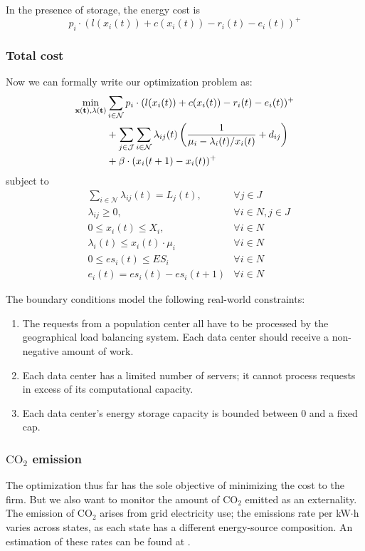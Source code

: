 \documentclass{acm_proc_article-sp}
\newcommand{\carbondioxide}{\ensuremath{\mathrm{CO}_2}}
\begin{document}
In the presence of storage, the energy cost is
\begin{equation}
p_i \cdot (l(x_i(t)) + c(x_i(t)) - r_i(t) - e_i(t))^+
\end{equation}

\subsubsection{Total cost}
Now we can formally write our optimization problem as:
\begin{align*}
\min_{\bf{x}(t), \bf{\lambda}(t)} & \sum_{i \in \mathcal{N}} p_i \cdot (l(x_i(t)) + c(x_i(t)) - r_i(t) - e_i(t))^+ \\
& + \sum_{j \in \mathcal{J}}\sum_{i \in \mathcal{N}}
\lambda_{ij}(t)\left(\frac{1}{\mu_i - \lambda_i(t)/x_i(t)} + d_{ij}\right) \\
& + \beta \cdot (x_i(t+1) - x_i(t))^+
\end{align*}
subject to
\begin{align*}
& \sum_{i\in \mathcal{N}}\lambda_{ij}(t) = L_j(t), &\forall j\in J \\
& \lambda_{ij} \geq 0, & \forall i\in N, j\in J \\
& 0 \leq x_i(t) \leq X_i, & \forall i \in N \\
& \lambda_i(t) \leq x_i(t) \cdot \mu_i & \forall i \in N \\
& 0 \leq es_i(t) \leq ES_i & \forall i \in N \\
& e_i(t) = es_i(t) - es_i(t+1) & \forall i \in N
\end{align*}

The boundary conditions model the following real-world constraints:
\begin{enumerate}
\item
The requests from a population center all have to be processed by the geographical load balancing system. Each data center should receive a non-negative amount of work.
\item
Each data center has a limited number of servers; it cannot process requests in excess of its computational capacity.
\item
Each data center's energy storage capacity is bounded between $0$ and a fixed cap.
\end{enumerate}
\subsubsection{\carbondioxide{} emission}
The optimization thus far has the sole objective of minimizing the cost to the firm. But we also want to monitor the amount of \carbondioxide{} emitted as an externality. The emission of \carbondioxide{} arises from grid electricity use; the emissions rate per kW$\cdot{}$h varies across states, as each state has a different energy-source composition. An estimation of these rates can be found at \cite{carbon}.
\end{document}
